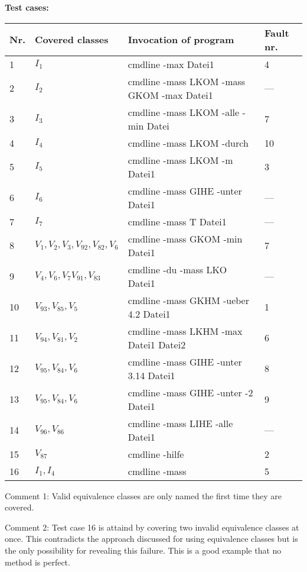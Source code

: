 \medskip
\textbf{Test cases:}
\smallskip

\begin{tabular}{l|l|l|l}
Nr. & Covered classes	  	& Invocation of program 		   & Fault nr. \\ \hline
1   & $I_1$         		& cmdline -max Datei1                       & 4   \\
2   & $I_2$                     & cmdline -mass LKOM -mass GKOM -max Datei1 & --- \\
3   & $I_3$                     & cmdline -mass LKOM -alle -min Datei       & 7   \\
4   & $I_4$                     & cmdline -mass LKOM -durch                 & 10   \\
5   & $I_5$                     & cmdline -mass LKOM -m Datei1              & 3   \\
6   & $I_6$                     & cmdline -mass GIHE -unter Datei1          & --- \\
7   & $I_7$                     & cmdline -mass T Datei1                    & --- \\
8   & $V_1,V_2,V_3,V_{92},V_{82},V_6$& cmdline -mass GKOM -min  Datei1     & 7   \\
9   & $V_4, V_6, V_7 V_{91}, V_{83}$& cmdline -du -mass LKO Datei1          & --- \\
10  & $V_{93}, V_{85}, V_5$     & cmdline -mass GKHM -ueber 4.2 Datei1    & 1   \\
11  & $V_{94}, V_{81}, V_2$     & cmdline -mass LKHM -max Datei1 Datei2   & 6   \\
12  & $V_{95}, V_{84}, V_6$     & cmdline -mass GIHE -unter 3.14 Datei1   & 8   \\
13  & $V_{95}, V_{84}, V_6$     & cmdline -mass GIHE -unter -2 Datei1     & 9   \\
14  & $V_{96}, V_{86}$          & cmdline -mass LIHE -alle Datei1         & --- \\
15  & $V_{87}$                  & cmdline -hilfe                          & 2   \\
16  & $I_1, I_4$                & cmdline -mass                           & 5   \\
\end{tabular}

\medskip
Comment 1:  Valid equivalence classes are only named the first time they are covered.

\smallskip
Comment 2:  Test case 16 is attaind by covering two invalid equivalence classes 
at once.  This contradicts the approach discussed for using equivalence
classes but is the only possibility for revealing this failure.  This is
a good example that no method is perfect.
